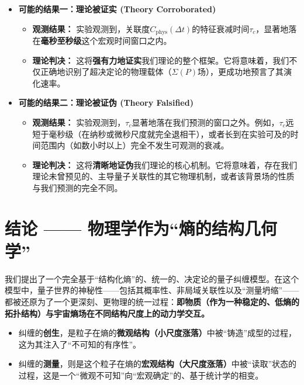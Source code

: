 \documentclass[12pt]{article}
\begin{document}
\begin{itemize}
    \item   \textbf{可能的结果一：理论被证实 (Theory Corroborated)}
    \begin{itemize}
        \item   \textbf{观测结果：} 实验观测到，关联度$C_{\text{phys}}(\Delta t)$的特征衰减时间$\tau_c$，显著地落在\textbf{毫秒至秒级}这个宏观时间窗口之内。
        \item   \textbf{理论判决：} 这将\textbf{强有力地证实}我们理论的整个框架。它将意味着，我们不仅正确地识别了超决定论的物理载体（$\Sigma(P)$场），更成功地预言了其演化速率。
    \end{itemize}

    \item   \textbf{可能的结果二：理论被证伪 (Theory Falsified)}
    \begin{itemize}
        \item   \textbf{观测结果：} 实验观测到，$\tau_c$显著地落在我们预测的窗口之外。例如，$\tau_c$远短于毫秒级（在纳秒或微秒尺度就完全退相干），或者长到在实验可及的时间范围内（如数小时以上）完全不发生可观测的衰减。
        \item   \textbf{理论判决：} 这将\textbf{清晰地证伪}我们理论的核心机制。它将意味着，存在我们理论未曾预见的、主导量子关联性的其它物理机制，或者该背景场的性质与我们预测的完全不同。
    \end{itemize}
\end{itemize}



\section{结论 —— 物理学作为``熵的结构几何学''}

我们提出了一个完全基于``结构化熵''的、统一的、决定论的量子纠缠模型。在这个模型中，量子世界的神秘性——包括其概率性、非局域关联性以及``测量坍缩''——都被还原为了一个更深刻、更物理的统一过程：\textbf{即物质（作为一种稳定的、低熵的拓扑结构）与宇宙熵场在不同结构尺度上的动力学交互。}

\begin{itemize}
    \item   纠缠的\textbf{创生}，是粒子在熵的\textbf{微观结构（小尺度涨落）}中被``铸造''成型的过程，这为其注入了``不可知的有序性''。
    \item   纠缠的\textbf{测量}，则是这个粒子在熵的\textbf{宏观结构（大尺度涨落）}中被``读取''状态的过程，这是一个``微观不可知''向``宏观确定''的、基于统计学的相变。
\end{itemize}
\end{document}
